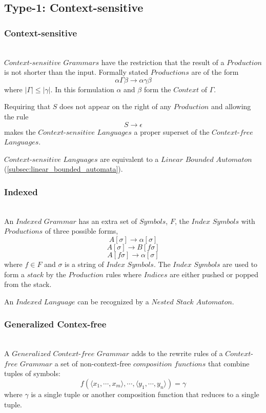 \documentclass{article}
\begin{document}
\subsection{Type-1: Context-sensitive}

\subsubsection{Context-sensitive} \hfill \\
$Context$-$sensitive$ $Grammars$ have the restriction that the result
of a $Production$ is not shorter than the input. Formally stated
$Productions$ are of the form
\[
    \alpha \Gamma \beta \rightarrow \alpha \gamma \beta
\]
where $|\Gamma| \leq |\gamma|$. In this formulation $\alpha$ and $\beta$ form
the $Context$ of $\Gamma$.

Requiring that $S$ does not appear on the right of any $Production$
and allowing the rule
\[
    S \rightarrow \epsilon
\]
makes the $Context$-$sensitive$ $Languages$ a proper superset of the
$Context$-$free$ $Languages$.

$Context$-$sensitive$ $Languages$ are equivalent to a $Linear$
$Bounded$ $Automaton$ (\ref{subsec:linear_bounded_automata}).

\subsubsection{Indexed} \hfill \\
An $Indexed$ $Grammar$ has an extra set of $Symbols$, $F$, the $Index$
$Symbols$ with $Productions$ of three possible forms,
\[
    A[\sigma] \rightarrow \alpha[\sigma]
\]\[
    A[\sigma] \rightarrow B[f\sigma]
\]\[
    A[f\sigma] \rightarrow \alpha[\sigma]
\]
where $f \in F$ and $\sigma$ is a string of $Index$ $Symbols$. The
$Index$ $Symbols$ are used to form a $stack$ by the $Production$ rules
where $Indices$ are either pushed or popped from the stack.

An $Indexed$ $Language$ can be recognized by a $Nested$ $Stack$
$Automaton$\cite{aho69}.

\subsubsection{Generalized Contex-free} \hfill \\
A $Generalized$ $Context$-$free$ $Grammar$ adds to the rewrite rules
of a $Context$-$free$ $Grammar$ a set of non-context-free
$composition$ $functions$ that combine tuples of symbols:
\[
    f(\langle x_1,\cdots,x_m\rangle,\cdots,\langle
    y_1,\cdots,y_n\rangle)=\gamma
\]
where $\gamma$ is a single tuple or another composition function that
reduces to a single tuple.
\end{document}
